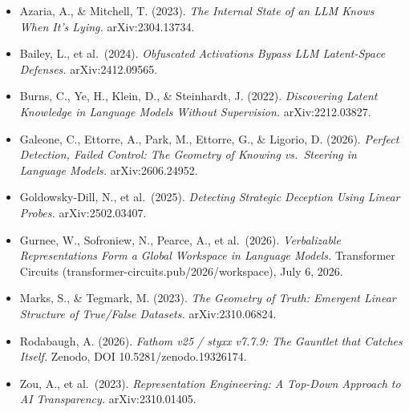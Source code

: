 \documentclass[
  11pt,
]{article}
\providecommand{\tightlist}{%
  \setlength{\itemsep}{0pt}\setlength{\parskip}{0pt}}
\begin{document}
\begin{itemize}
\tightlist
\item
  Azaria, A., \& Mitchell, T. (2023). \emph{The Internal State of an LLM
  Knows When It's Lying.} arXiv:2304.13734.
\item
  Bailey, L., et al.~(2024). \emph{Obfuscated Activations Bypass LLM
  Latent-Space Defenses.} arXiv:2412.09565.
\item
  Burns, C., Ye, H., Klein, D., \& Steinhardt, J. (2022).
  \emph{Discovering Latent Knowledge in Language Models Without
  Supervision.} arXiv:2212.03827.
\item
  Galeone, C., Ettorre, A., Park, M., Ettorre, G., \& Ligorio, D.
  (2026). \emph{Perfect Detection, Failed Control: The Geometry of
  Knowing vs.~Steering in Language Models.} arXiv:2606.24952.
\item
  Goldowsky-Dill, N., et al.~(2025). \emph{Detecting Strategic Deception
  Using Linear Probes.} arXiv:2502.03407.
\item
  Gurnee, W., Sofroniew, N., Pearce, A., et al.~(2026).
  \emph{Verbalizable Representations Form a Global Workspace in Language
  Models.} Transformer Circuits
  (transformer-circuits.pub/2026/workspace), July 6, 2026.
\item
  Marks, S., \& Tegmark, M. (2023). \emph{The Geometry of Truth:
  Emergent Linear Structure of True/False Datasets.} arXiv:2310.06824.
\item
  Rodabaugh, A. (2026). \emph{Fathom v25 / styxx v7.7.9: The Gauntlet
  that Catches Itself.} Zenodo, DOI 10.5281/zenodo.19326174.
\item
  Zou, A., et al.~(2023). \emph{Representation Engineering: A Top-Down
  Approach to AI Transparency.} arXiv:2310.01405.
\end{itemize}
\end{document}
